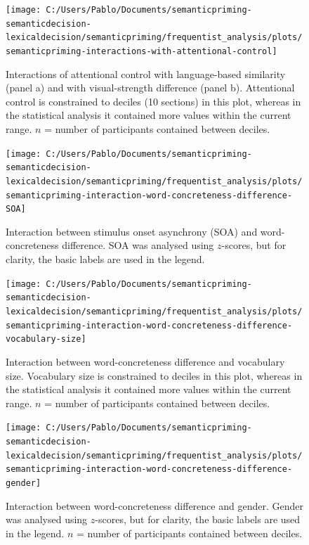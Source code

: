 \documentclass[
  12pt,
  man,floatsintext]{apa7}
\begin{document}
\begin{figure}

{\centering \texttt{[image: C:/Users/Pablo/Documents/semanticpriming-semanticdecision-lexicaldecision/semanticpriming/frequentist\_analysis/plots/semanticpriming-interactions-with-attentional-control]} 

}

\caption{Interactions of attentional control with language-based similarity (panel a) and with visual-strength difference (panel b). Attentional control is constrained to deciles (10 sections) in this plot, whereas in the statistical analysis it contained more values within the current range. \(n\) = number of participants contained between deciles.}\label{fig:semanticpriming-interactions-with-attentional-control}
\end{figure}

\begin{figure}

{\centering \texttt{[image: C:/Users/Pablo/Documents/semanticpriming-semanticdecision-lexicaldecision/semanticpriming/frequentist\_analysis/plots/semanticpriming-interaction-word-concreteness-difference-SOA]} 

}

\caption{Interaction between stimulus onset asynchrony (SOA) and word-concreteness difference. SOA was analysed using $z$-scores, but for clarity, the basic labels are used in the legend.}\label{fig:semanticpriming-interaction-word-concreteness-difference-SOA}
\end{figure}



\begin{figure}

{\centering \texttt{[image: C:/Users/Pablo/Documents/semanticpriming-semanticdecision-lexicaldecision/semanticpriming/frequentist\_analysis/plots/semanticpriming-interaction-word-concreteness-difference-vocabulary-size]} 

}

\caption{Interaction between word-concreteness difference and vocabulary size. Vocabulary size is constrained to deciles in this plot, whereas in the statistical analysis it contained more values within the current range. \(n\) = number of participants contained between deciles.}\label{fig:semanticpriming-interaction-word-concreteness-difference-vocabulary-size}
\end{figure}



\begin{figure}

{\centering \texttt{[image: C:/Users/Pablo/Documents/semanticpriming-semanticdecision-lexicaldecision/semanticpriming/frequentist\_analysis/plots/semanticpriming-interaction-word-concreteness-difference-gender]} 

}

\caption{Interaction between word-concreteness difference and gender. Gender was analysed using \(z\)-scores, but for clarity, the basic labels are used in the legend. \(n\) = number of participants contained between deciles.}\label{fig:semanticpriming-interaction-word-concreteness-difference-gender}
\end{figure}
\end{document}
